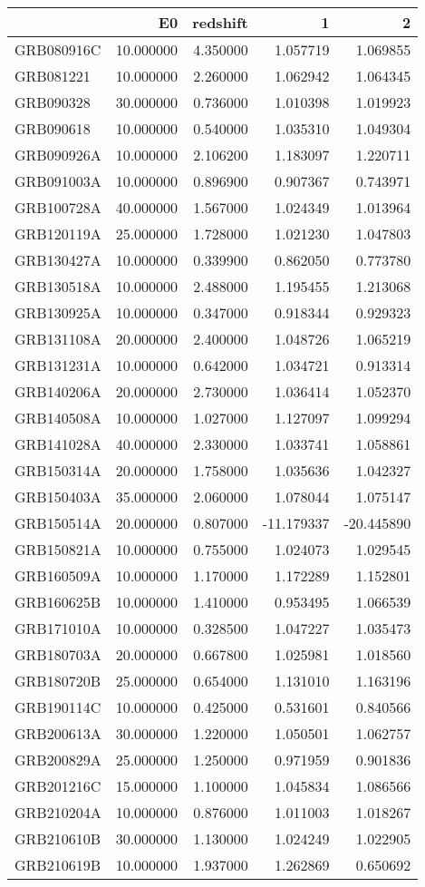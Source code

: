 \begin{tabular}{lrrrr}
\toprule
 & E0 & redshift & 1 & 2 \\
\midrule
GRB080916C & 10.000000 & 4.350000 & 1.057719 & 1.069855 \\
GRB081221 & 10.000000 & 2.260000 & 1.062942 & 1.064345 \\
GRB090328 & 30.000000 & 0.736000 & 1.010398 & 1.019923 \\
GRB090618 & 10.000000 & 0.540000 & 1.035310 & 1.049304 \\
GRB090926A & 10.000000 & 2.106200 & 1.183097 & 1.220711 \\
GRB091003A & 10.000000 & 0.896900 & 0.907367 & 0.743971 \\
GRB100728A & 40.000000 & 1.567000 & 1.024349 & 1.013964 \\
GRB120119A & 25.000000 & 1.728000 & 1.021230 & 1.047803 \\
GRB130427A & 10.000000 & 0.339900 & 0.862050 & 0.773780 \\
GRB130518A & 10.000000 & 2.488000 & 1.195455 & 1.213068 \\
GRB130925A & 10.000000 & 0.347000 & 0.918344 & 0.929323 \\
GRB131108A & 20.000000 & 2.400000 & 1.048726 & 1.065219 \\
GRB131231A & 10.000000 & 0.642000 & 1.034721 & 0.913314 \\
GRB140206A & 20.000000 & 2.730000 & 1.036414 & 1.052370 \\
GRB140508A & 10.000000 & 1.027000 & 1.127097 & 1.099294 \\
GRB141028A & 40.000000 & 2.330000 & 1.033741 & 1.058861 \\
GRB150314A & 20.000000 & 1.758000 & 1.035636 & 1.042327 \\
GRB150403A & 35.000000 & 2.060000 & 1.078044 & 1.075147 \\
GRB150514A & 20.000000 & 0.807000 & -11.179337 & -20.445890 \\
GRB150821A & 10.000000 & 0.755000 & 1.024073 & 1.029545 \\
GRB160509A & 10.000000 & 1.170000 & 1.172289 & 1.152801 \\
GRB160625B & 10.000000 & 1.410000 & 0.953495 & 1.066539 \\
GRB171010A & 10.000000 & 0.328500 & 1.047227 & 1.035473 \\
GRB180703A & 20.000000 & 0.667800 & 1.025981 & 1.018560 \\
GRB180720B & 25.000000 & 0.654000 & 1.131010 & 1.163196 \\
GRB190114C & 10.000000 & 0.425000 & 0.531601 & 0.840566 \\
GRB200613A & 30.000000 & 1.220000 & 1.050501 & 1.062757 \\
GRB200829A & 25.000000 & 1.250000 & 0.971959 & 0.901836 \\
GRB201216C & 15.000000 & 1.100000 & 1.045834 & 1.086566 \\
GRB210204A & 10.000000 & 0.876000 & 1.011003 & 1.018267 \\
GRB210610B & 30.000000 & 1.130000 & 1.024249 & 1.022905 \\
GRB210619B & 10.000000 & 1.937000 & 1.262869 & 0.650692 \\
\bottomrule
\end{tabular}
